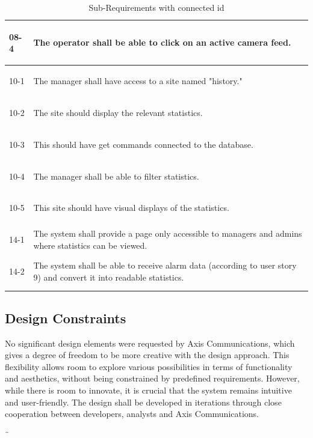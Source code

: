 \documentclass{article}
\begin{document}
\begin{longtable}{|l|p{15cm}|}
\hline
\hypertarget{08-4}{08-4} & The operator shall be able to click on an active camera feed. \\
\hline
\hypertarget{10-1}{10-1} & The manager shall have access to a site named "history." \\
\hline
\hypertarget{10-2}{10-2} & The site should display the relevant statistics. \\
\hline
\hypertarget{10-3}{10-3} & This should have get commands connected to the database. \\
\hline
\hypertarget{10-4}{10-4} & The manager shall be able to filter statistics. \\
\hline
\hypertarget{10-5}{10-5} & This site should have visual displays of the statistics. \\
\hline
\hypertarget{14-1}{14-1} & The system shall provide a page only accessible to managers and admins where statistics can be viewed. \\
\hline
\hypertarget{14-2}{14-2} & The system shall be able to receive alarm data (according to user story 9) and convert it into readable statistics. \\
\hline
\captionsetup{justification=centering}
\caption{Sub-Requirements with connected id}
\label{table:longtable}
\end{longtable}

\subsection{Design Constraints}


No significant design elements were requested by Axis Communications, which gives a degree of freedom to be more creative with the design approach. This flexibility allows room to explore various possibilities in terms of functionality and aesthetics, without being constrained by predefined requirements. However, while there is room to innovate, it is crucial that the system remains intuitive and user-friendly. The design shall be developed in iterations through close cooperation between developers, analysts and Axis Communications.

\newpage
¨%



\printbibliography


\end{document}

